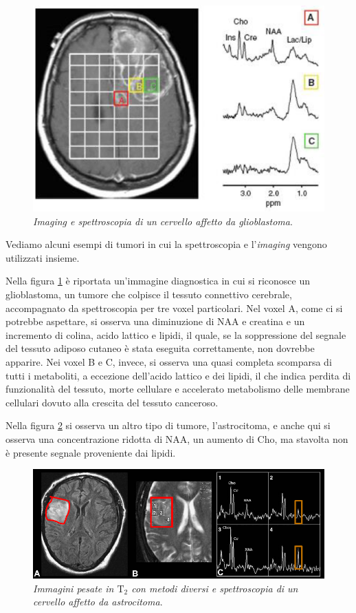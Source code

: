 \documentclass{report}
\newcommand{\figref}[1]{figura \ref{#1}}
\numberwithin{equation}{section}
\numberwithin{figure}{section}
\begin{document}
\begin{figure}[htp]
\centering
\includegraphics[scale=0.85]{immagini/glio.png}
\caption{\label{fig:glio} \textit{Imaging e spettroscopia di un cervello affetto da glioblastoma}.}
\end{figure}

\noindent Vediamo alcuni esempi di tumori in cui la spettroscopia e l'\textit{imaging} vengono utilizzati insieme.

Nella \figref{fig:glio} è riportata un'immagine diagnostica in cui si riconosce un glioblastoma, un tumore che colpisce il tessuto connettivo cerebrale, accompagnato da spettroscopia per tre voxel particolari. Nel voxel A, come ci si potrebbe aspettare, si osserva una diminuzione di NAA e creatina e un incremento di colina, acido lattico e lipidi, il quale, se la soppressione del segnale del tessuto adiposo cutaneo è stata eseguita correttamente, non dovrebbe apparire. Nei voxel B e C, invece, si osserva una quasi completa scomparsa di tutti i metaboliti, a eccezione dell'acido lattico e dei lipidi, il che indica perdita di funzionalità del tessuto, morte cellulare e accelerato metabolismo delle membrane cellulari dovuto alla crescita del tessuto canceroso.

Nella \figref{fig:astro} si osserva un altro tipo di tumore, l'astrocitoma, e anche qui si osserva una concentrazione ridotta di NAA, un aumento di Cho, ma stavolta non è presente segnale proveniente dai lipidi.

\begin{figure}[htp]
\centering
\includegraphics[scale=0.86]{immagini/astro.png}
\caption{\label{fig:astro} \textit{Immagini pesate in $\mathrm{T_2}$ con metodi diversi e spettroscopia di un cervello affetto da astrocitoma}.}
\end{figure}
\end{document}
